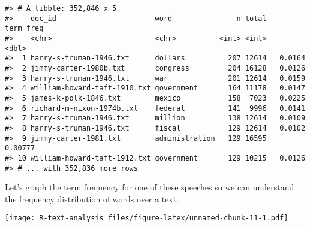 \documentclass[]{book}
\newenvironment{Shaded}{\begin{snugshade}}{\end{snugshade}}
\newcommand{\DataTypeTok}[1]{\textcolor[rgb]{0.13,0.29,0.53}{#1}}
\newcommand{\FloatTok}[1]{\textcolor[rgb]{0.00,0.00,0.81}{#1}}
\newcommand{\KeywordTok}[1]{\textcolor[rgb]{0.13,0.29,0.53}{\textbf{#1}}}
\newcommand{\NormalTok}[1]{#1}
\newcommand{\OperatorTok}[1]{\textcolor[rgb]{0.81,0.36,0.00}{\textbf{#1}}}
\newcommand{\OtherTok}[1]{\textcolor[rgb]{0.56,0.35,0.01}{#1}}
\newcommand{\StringTok}[1]{\textcolor[rgb]{0.31,0.60,0.02}{#1}}
\begin{document}
\begin{Shaded}
\end{Shaded}

\begin{verbatim}
#> # A tibble: 352,846 x 5
#>    doc_id                       word               n total term_freq
#>    <chr>                        <chr>          <int> <int>     <dbl>
#>  1 harry-s-truman-1946.txt      dollars          207 12614   0.0164 
#>  2 jimmy-carter-1980b.txt       congress         204 16128   0.0126 
#>  3 harry-s-truman-1946.txt      war              201 12614   0.0159 
#>  4 william-howard-taft-1910.txt government       164 11178   0.0147 
#>  5 james-k-polk-1846.txt        mexico           158  7023   0.0225 
#>  6 richard-m-nixon-1974b.txt    federal          141  9996   0.0141 
#>  7 harry-s-truman-1946.txt      million          138 12614   0.0109 
#>  8 harry-s-truman-1946.txt      fiscal           129 12614   0.0102 
#>  9 jimmy-carter-1981.txt        administration   129 16595   0.00777
#> 10 william-howard-taft-1912.txt government       129 10215   0.0126 
#> # ... with 352,836 more rows
\end{verbatim}

Let's graph the term frequency for one of these speeches so we can understand the frequency distribution of words over a text.

\begin{Shaded}
\end{Shaded}

\texttt{[image: R-text-analysis\_files/figure-latex/unnamed-chunk-11-1.pdf]}
\end{document}
